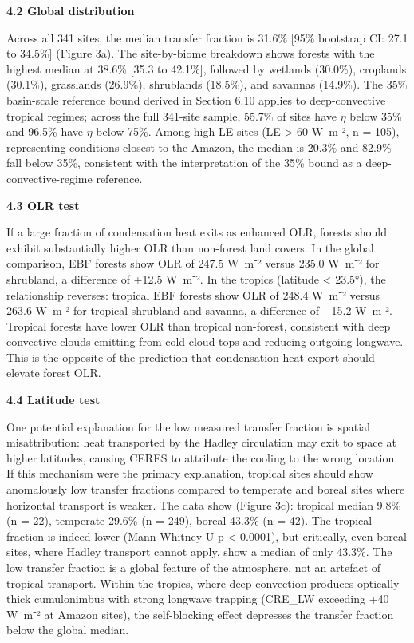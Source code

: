\textbf{4.2 Global distribution}

Across all 341 sites, the median transfer fraction is 31.6\% {[}95\%
bootstrap CI: 27.1 to 34.5\%{]} (Figure 3a). The site-by-biome breakdown
shows forests with the highest median at 38.6\% {[}35.3 to 42.1\%{]},
followed by wetlands (30.0\%), croplands (30.1\%), grasslands (26.9\%),
shrublands (18.5\%), and savannas (14.9\%). The 35\% basin-scale
reference bound derived in Section 6.10 applies to deep-convective
tropical regimes; across the full 341-site sample, 55.7\% of sites
have $\eta$ below 35\% and 96.5\% have $\eta$ below 75\%. Among
high-LE sites (LE \textgreater{} 60 W~m⁻², n = 105), representing
conditions closest to the Amazon, the median is 20.3\% and 82.9\%
fall below 35\%, consistent with the interpretation of the 35\% bound
as a deep-convective-regime reference.

\textbf{4.3 OLR test}

If a large fraction of condensation heat exits as enhanced OLR, forests
should exhibit substantially higher OLR than non-forest land covers. In
the global comparison, EBF forests show OLR of 247.5 W~m⁻² versus 235.0
W~m⁻² for shrubland, a difference of +12.5 W~m⁻². In the tropics
(\textbar latitude\textbar{} \textless{} 23.5°), the relationship
reverses: tropical EBF forests show OLR of 248.4 W~m⁻² versus 263.6
W~m⁻² for tropical shrubland and savanna, a difference of −15.2 W~m⁻².
Tropical forests have lower OLR than tropical non-forest, consistent
with deep convective clouds emitting from cold cloud tops and reducing
outgoing longwave. This is the opposite of the prediction that
condensation heat export should elevate forest OLR.

\textbf{4.4 Latitude test}

One potential explanation for the low measured transfer fraction is
spatial misattribution: heat transported by
the Hadley circulation may exit to space at higher latitudes, causing
CERES to attribute the cooling to the wrong location. If this mechanism
were the primary explanation, tropical sites should show anomalously low
transfer fractions compared to temperate and boreal sites where
horizontal transport is weaker. The data show (Figure 3c): tropical
median 9.8\% (n = 22), temperate 29.6\% (n = 249), boreal 43.3\% (n =
42). The tropical fraction is indeed lower (Mann-Whitney U p \textless{}
0.0001), but critically, even boreal sites, where Hadley transport
cannot apply, show a median of only 43.3\%. The low transfer fraction is
a global feature of the atmosphere, not an artefact of tropical
transport. Within the tropics, where deep convection produces optically
thick cumulonimbus with strong longwave trapping (CRE\_LW exceeding +40
W~m⁻² at Amazon sites), the self-blocking effect depresses the transfer
fraction below the global median.


